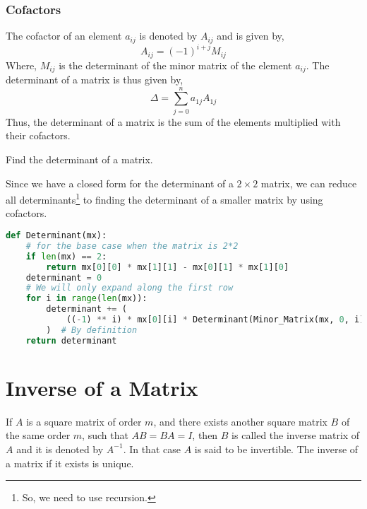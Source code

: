 \subsubsection{Cofactors}
The cofactor of an element $a_{ij}$ is denoted by $A_{ij}$ and is given by,
\[A_{ij}=(-1)^{i+j}M_{ij}\]
Where, $M_{ij}$ is the determinant of the minor matrix of the element $a_{ij}$.
The determinant of a matrix is thus given by,
\[\Delta=\sum\limits_{j=0}^n a_{1j}A_{1j}\]
Thus, the determinant of a matrix is the sum of the elements multiplied with their cofactors.
\begin{eg}
	Find the determinant of a matrix.
\end{eg}
\begin{explanation}
	Since we have a closed form for the determinant of a $2\times 2$ matrix, we can reduce all determinants\footnote{So, we need to use recursion.} to finding the determinant of a smaller matrix by using cofactors.
	\begin{lstlisting}[language=Python, numbers=none]
def Determinant(mx):
	# for the base case when the matrix is 2*2
	if len(mx) == 2:
		return mx[0][0] * mx[1][1] - mx[0][1] * mx[1][0]
	determinant = 0
	# We will only expand along the first row
	for i in range(len(mx)):
		determinant += (
			((-1) ** i) * mx[0][i] * Determinant(Minor_Matrix(mx, 0, i))
		)  # By definition
	return determinant \end{lstlisting}
\end{explanation}
\section{Inverse of a Matrix}
If $A$ is a square matrix of order $m$, and there exists another square matrix $B$ of the same order $m$, such that $AB=BA=I$, then $B$ is called the inverse matrix of $A$ and it is denoted by $A^{-1}$. In that case $A$ is said to be invertible. The inverse of a matrix if it exists is unique.\
